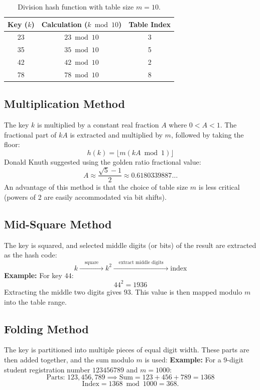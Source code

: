 \begin{table}[htbp]
\centering
\small
\begin{tabular}{c c c}
\toprule
\textbf{Key ($k$)} & \textbf{Calculation ($k \bmod 10$)} & \textbf{Table Index} \\
\midrule
23 & $23 \bmod 10$ & 3 \\
35 & $35 \bmod 10$ & 5 \\
42 & $42 \bmod 10$ & 2 \\
78 & $78 \bmod 10$ & 8 \\
\bottomrule
\end{tabular}
\caption{Division hash function with table size $m = 10$.}
\end{table}

\subsection{Multiplication Method}
The key $k$ is multiplied by a constant real fraction $A$ where $0 < A < 1$. The fractional part of $k A$ is extracted and multiplied by $m$, followed by taking the floor:
\[
\boxed{h(k) = \lfloor m (k A \bmod 1) \rfloor}
\]
Donald Knuth suggested using the golden ratio fractional value:
\[
A \approx \frac{\sqrt{5} - 1}{2} \approx 0.6180339887\dots
\]
An advantage of this method is that the choice of table size $m$ is less critical (powers of 2 are easily accommodated via bit shifts).

\subsection{Mid-Square Method}
The key is squared, and selected middle digits (or bits) of the result are extracted as the hash code:
\[
k \xrightarrow{\quad\text{square}\quad} k^2 \xrightarrow{\quad\text{extract middle digits}\quad} \text{index}
\]
\textbf{Example:} For key $44$:
\[
44^2 = 1936
\]
Extracting the middle two digits gives $93$. This value is then mapped modulo $m$ into the table range.

\subsection{Folding Method}
The key is partitioned into multiple pieces of equal digit width. These parts are then added together, and the sum modulo $m$ is used:
\textbf{Example:} For a 9-digit student registration number $123456789$ and $m = 1000$:
\[
\text{Parts: } 123, 456, 789 \implies \text{Sum} = 123 + 456 + 789 = 1368
\]
\[
\text{Index} = 1368 \bmod 1000 = 368.
\]

